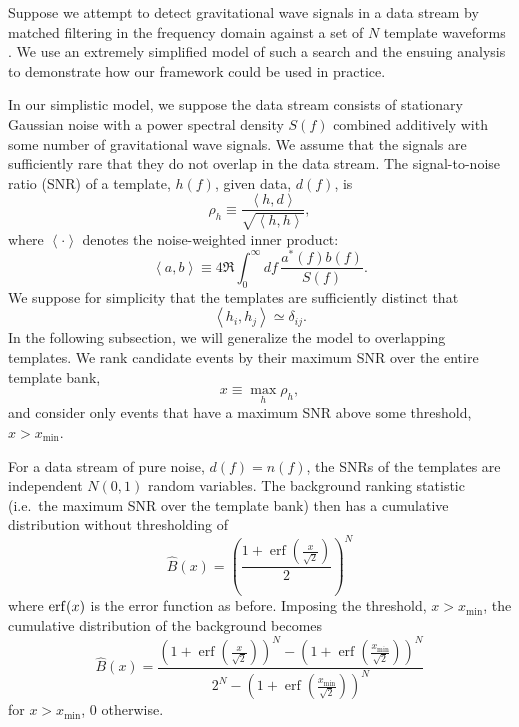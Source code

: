 \documentclass[aps,prd,reprint,nofootinbib]{revtex4-1}
\newcommand{\xmin}{x_\mathrm{min}}
\DeclareMathOperator{\erf}{erf}
\begin{document}
Suppose we attempt to detect gravitational wave signals in a data
stream by matched filtering in the frequency domain against a set of
$N$ template waveforms \citep[e.g.,][]{findchirppaper,s6-lowmass}.  We
use an extremely simplified model of such a search and the ensuing
analysis to demonstrate how our framework could be used in practice.

In our simplistic model, we suppose the data stream consists of
stationary Gaussian noise with a power spectral density $S(f)$
combined additively with some number of gravitational wave signals.
We assume that the signals are sufficiently rare that they do not
overlap in the data stream.  The signal-to-noise ratio (SNR) of a
template, $h(f)$, given data, $d(f)$, is
\begin{equation}
  \rho_h \equiv \frac{\left\langle h, d \right\rangle}{\sqrt{\left
      \langle h, h \right\rangle}},
\end{equation}
where $\left \langle \cdot \right\rangle$ denotes the noise-weighted
inner product:
\begin{equation}
  \left\langle a, b \right\rangle \equiv 4 \Re \int_0^\infty df\,
  \frac{a^*(f) b(f)}{S(f)}.
\end{equation}
We suppose for simplicity that the templates are sufficiently distinct
that
\begin{equation}
  \left\langle h_i, h_j \right\rangle \simeq \delta_{ij}.
\end{equation}
In the following subsection, we will generalize the model to
overlapping templates.  We rank candidate events by their maximum SNR
over the entire template bank,
\begin{equation}
  x \equiv \max_{h} \rho_h,
\end{equation}
and consider only events that have a maximum SNR above some threshold,
$x > \xmin$.

For a data stream of pure noise, $d(f) = n(f)$, the SNRs of the
templates are independent $N(0,1)$ random variables.  The background
ranking statistic (i.e.\ the maximum SNR over the template bank) then
has a cumulative distribution without thresholding of
\begin{equation}
  \hat{B}(x) = \left( \frac{1 + \erf\left( \frac{x}{\sqrt{2}}
    \right)}{2} \right)^N
\end{equation}
where ${\rm erf}(x)$ is the error function as before. Imposing the
threshold, $x > \xmin$, the cumulative distribution of the background
becomes
\begin{equation}
  \label{eq:analytic-background-rate}
  \hat{B}(x) = \frac{\left( 1 + \erf\left( \frac{x}{{\sqrt{2}}}
    \right) \right)^N - \left( 1 + \erf\left( \frac{\xmin}{{\sqrt{2}}}
    \right) \right)^N}{2^N - \left( 1 + \erf\left(
    \frac{\xmin}{{\sqrt{2}}} \right) \right)^N }
\end{equation}
for $x>\xmin$, $0$ otherwise.
\end{document}
